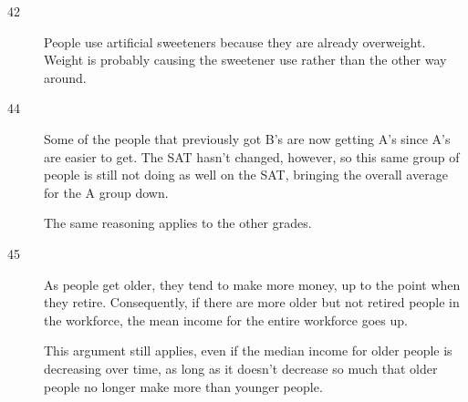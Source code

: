 \documentclass[letterpaper, landscape]{exam}
\begin{document}
\begin{description}

      \item[42]
        People use artificial sweeteners because they are already overweight.
        Weight is probably causing the sweetener use rather than the other way
        around.

      \item[44]
        Some of the people that previously got B's are now getting A's since A's
        are easier to get.  The SAT hasn't changed, however, so this same group
        of people is still not doing as well on the SAT, bringing the overall
        average for the A group down.

        The same reasoning applies to the other grades.

      \item[45]
        As people get older, they tend to make more money, up to the point when
        they retire.  Consequently, if there are more older but not retired
        people in the workforce, the mean income for the entire workforce goes
        up.

        This argument still applies, even if the median income for older people
        is decreasing over time, as long as it doesn't decrease so much that
        older people no longer make more than younger people.


\end{description}
\end{document}
